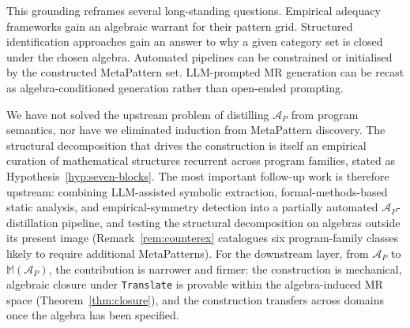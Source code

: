 \documentclass[acmsmall,screen,review]{acmart}
\begin{document}
This grounding reframes several long-standing questions. Empirical adequacy frameworks gain an algebraic warrant for their pattern grid. Structured identification approaches gain an answer to why a given category set is closed under the chosen algebra. Automated pipelines can be constrained or initialised by the constructed MetaPattern set. LLM-prompted MR generation can be recast as algebra-conditioned generation rather than open-ended prompting.

We have not solved the upstream problem of distilling $\mathcal{A}_P$ from program semantics, nor have we eliminated induction from MetaPattern discovery. The structural decomposition that drives the construction is itself an empirical curation of mathematical structures recurrent across program families, stated as Hypothesis~\ref{hyp:seven-blocks}. The most important follow-up work is therefore upstream: combining LLM-assisted symbolic extraction, formal-methods-based static analysis, and empirical-symmetry detection into a partially automated $\mathcal{A}_P$-distillation pipeline, and testing the structural decomposition on algebras outside its present image (Remark~\ref{rem:counterex} catalogues six program-family classes likely to require additional MetaPatterns). For the downstream layer, from $\mathcal{A}_P$ to $\mathbb{M}(\mathcal{A}_P)$, the contribution is narrower and firmer: the construction is mechanical, algebraic closure under \texttt{Translate} is provable within the algebra-induced MR space (Theorem~\ref{thm:closure}), and the construction transfers across domains once the algebra has been specified.
\end{document}

